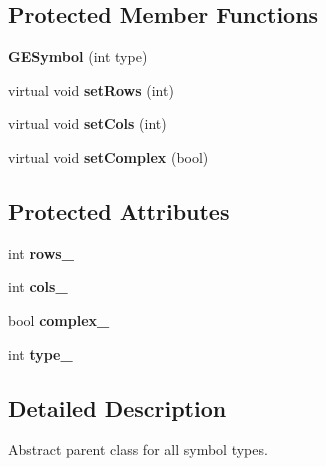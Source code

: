 \subsection*{Protected Member Functions}
\begin{DoxyCompactItemize}
\item 
\mbox{\label{class_g_e_symbol_a8bec3b923598e9daab2aab824a619db5}} 
{\bfseries G\+E\+Symbol} (int type)
\item 
\mbox{\label{class_g_e_symbol_a8f5a7ba90f2d124529d6b9d7aa59cb59}} 
virtual void {\bfseries set\+Rows} (int)
\item 
\mbox{\label{class_g_e_symbol_a5de6b791c1f11ef2a18e5e6335f1731e}} 
virtual void {\bfseries set\+Cols} (int)
\item 
\mbox{\label{class_g_e_symbol_abc3312d19d04a1eef62c0c4d255924df}} 
virtual void {\bfseries set\+Complex} (bool)
\end{DoxyCompactItemize}
\subsection*{Protected Attributes}
\begin{DoxyCompactItemize}
\item 
\mbox{\label{class_g_e_symbol_a36b478c80c6b652753f2b125d2de596a}} 
int {\bfseries rows\+\_\+}
\item 
\mbox{\label{class_g_e_symbol_ad6fa1f94281aebfc239e73aaefa34866}} 
int {\bfseries cols\+\_\+}
\item 
\mbox{\label{class_g_e_symbol_a8ad78c322adee566f1180f9d9b359798}} 
bool {\bfseries complex\+\_\+}
\item 
\mbox{\label{class_g_e_symbol_a0cc2349d51f6c7111f79755761f86f01}} 
int {\bfseries type\+\_\+}
\end{DoxyCompactItemize}


\subsection{Detailed Description}
Abstract parent class for all symbol types. 

